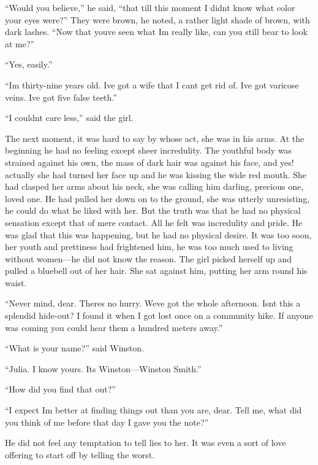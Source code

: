 ``Would you believe,'' he said, ``that till this moment I
didn\textquotesingle t know what color your eyes were?'' They were brown,
he noted, a rather light shade of brown, with dark lashes. ``Now that
you\textquotesingle ve seen what I\textquotesingle m really like, can
you still bear to look at me?''

``Yes, easily.''

``I\textquotesingle m thirty-nine years old. I\textquotesingle ve got a
wife that I can\textquotesingle t get rid of. I\textquotesingle ve got
varicose veins. I\textquotesingle ve got five false teeth.''

``I couldn\textquotesingle t care less,'' said the girl.

The next moment, it was hard to say by whose act, she was in his arms.
At the beginning he had no feeling except sheer incredulity. The
youthful body was strained against his own, the mass of dark hair was
against his face, and yes! actually she had turned her face up and he
was kissing the wide red mouth. She had clasped her arms about his neck,
she was calling him darling, precious one, loved one. He had pulled her
down on to the ground, she was utterly unresisting, he could do what he
liked with her. But the truth was that he had no physical sensation
except that of mere contact. All he felt was incredulity and pride. He
was glad that this was happening, but he had no physical desire. It was
too soon, her youth and prettiness had frightened him, he was too much
used to living without women---he did not know the reason. The girl
picked herself up and pulled a bluebell out of her hair. She sat against
him, putting her arm round his waist.

``Never mind, dear. There\textquotesingle s no hurry.
We\textquotesingle ve got the whole afternoon. Isn\textquotesingle t
this a splendid hide-out? I found it when I got lost once on a community
hike. If anyone was coming you could hear them a hundred meters away.''

``What is your name?'' said Winston.

``Julia. I know yours. It\textquotesingle s Winston---Winston Smith.''

``How did you find that out?''

``I expect I\textquotesingle m better at finding things out than you are,
dear. Tell me, what did you think of me before that day I gave you the
note?''

He did not feel any temptation to tell lies to her. It was even a sort
of love offering to start off by telling the worst.

